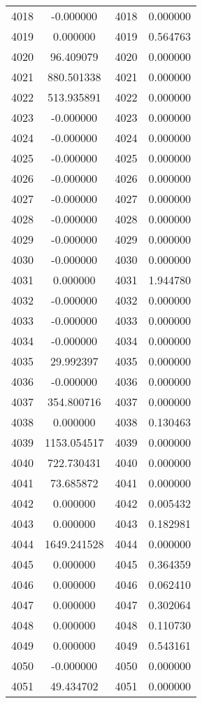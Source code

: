 \documentclass[12pt]{article}
\begin{document}
\begin{longtable}{@{}cccc@{}}
4018 & -0.000000 & 4018 & 0.000000 \\
4019 & 0.000000 & 4019 & 0.564763 \\
4020 & 96.409079 & 4020 & 0.000000 \\
4021 & 880.501338 & 4021 & 0.000000 \\
4022 & 513.935891 & 4022 & 0.000000 \\
4023 & -0.000000 & 4023 & 0.000000 \\
4024 & -0.000000 & 4024 & 0.000000 \\
4025 & -0.000000 & 4025 & 0.000000 \\
4026 & -0.000000 & 4026 & 0.000000 \\
4027 & -0.000000 & 4027 & 0.000000 \\
4028 & -0.000000 & 4028 & 0.000000 \\
4029 & -0.000000 & 4029 & 0.000000 \\
4030 & -0.000000 & 4030 & 0.000000 \\
4031 & 0.000000 & 4031 & 1.944780 \\
4032 & -0.000000 & 4032 & 0.000000 \\
4033 & -0.000000 & 4033 & 0.000000 \\
4034 & -0.000000 & 4034 & 0.000000 \\
4035 & 29.992397 & 4035 & 0.000000 \\
4036 & -0.000000 & 4036 & 0.000000 \\
4037 & 354.800716 & 4037 & 0.000000 \\
4038 & 0.000000 & 4038 & 0.130463 \\
4039 & 1153.054517 & 4039 & 0.000000 \\
4040 & 722.730431 & 4040 & 0.000000 \\
4041 & 73.685872 & 4041 & 0.000000 \\
4042 & 0.000000 & 4042 & 0.005432 \\
4043 & 0.000000 & 4043 & 0.182981 \\
4044 & 1649.241528 & 4044 & 0.000000 \\
4045 & 0.000000 & 4045 & 0.364359 \\
4046 & 0.000000 & 4046 & 0.062410 \\
4047 & 0.000000 & 4047 & 0.302064 \\
4048 & 0.000000 & 4048 & 0.110730 \\
4049 & 0.000000 & 4049 & 0.543161 \\
4050 & -0.000000 & 4050 & 0.000000 \\
4051 & 49.434702 & 4051 & 0.000000 \\

\end{longtable}
\end{document}
